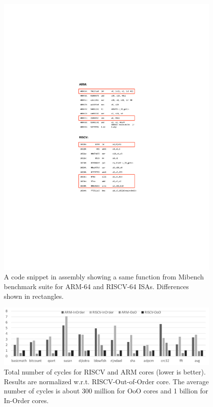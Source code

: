 \begin{figure}[]
	\centering
	\includegraphics[width=0.8\columnwidth]{figures/code.pdf}
	\caption{A code snippet in assembly showing a same function from Mibench benchmark suite for ARM-64 and RISCV-64 ISAs. Differences shown in rectangles.}
	\label{fig:code}
\end{figure} 

\begin{figure}[htb]
	\centering
	\includegraphics[width=1.9\columnwidth]{figures/cyc.pdf}
	\caption{Total number of cycles for RISCV and ARM cores (lower is better). Results are normalized w.r.t. RISCV-Out-of-Order core. The average number of cycles is about 300 million for OoO cores and 1 billion for In-Order cores.}
	\label{fig:totCyc}
\end{figure} 

